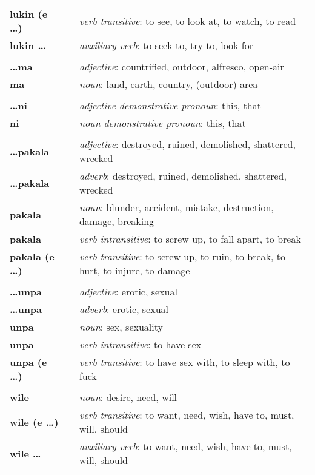 \begin{supertabular}{p{2,5cm}|ll}
\textbf{lukin (e \dots)} && \textit{verb transitive}: to see, to look at, to watch, to read \\ %
\textbf{lukin \dots} && \textit{auxiliary verb}: to seek to, try to, look for \\ %
 && \\ %
\textbf{\dots ma} && \textit{adjective}: countrified, outdoor, alfresco, open-air \\ %
\textbf{ma} && \textit{noun}: land, earth, country, (outdoor) area \\ %
 && \\ %
\textbf{\dots ni} && \textit{adjective demonstrative pronoun}: this, that \\ %
\textbf{ni} && \textit{noun demonstrative pronoun}: this, that \\ %
 && \\ %
\textbf{\dots pakala} && \textit{adjective}: destroyed, ruined, demolished, shattered, wrecked \\ %
\textbf{\dots pakala} && \textit{adverb}: destroyed, ruined, demolished, shattered, wrecked \\ %
\textbf{pakala} && \textit{noun}: blunder, accident, mistake, destruction, damage, breaking \\ %
\textbf{pakala} && \textit{verb intransitive}: to screw up, to fall apart, to break \\ %
\textbf{pakala (e \dots)} && \textit{verb transitive}: to screw up, to ruin, to break, to hurt, to injure, to damage \\ %
 && \\ %
\textbf{\dots unpa} && \textit{adjective}: erotic, sexual \\ %
\textbf{\dots unpa} && \textit{adverb}: erotic, sexual \\ %
\textbf{unpa} && \textit{noun}: sex, sexuality \\ %
\textbf{unpa} && \textit{verb intransitive}: to have sex \\ %
\textbf{unpa (e \dots)} && \textit{verb transitive}: to have sex with, to sleep with, to fuck \\ %
 && \\ %
\textbf{wile} && \textit{noun}: desire, need, will \\ %
\textbf{wile (e \dots)} && \textit{verb transitive}: to want, need, wish, have to, must, will, should \\ %
\textbf{wile \dots} && \textit{auxiliary verb}: to want, need, wish, have to, must, will, should \\ %
\end{supertabular} \\

